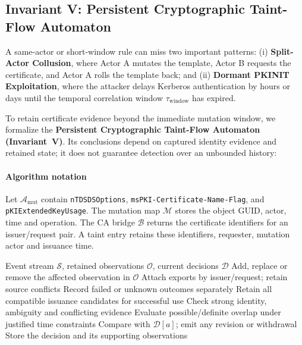 \subsection{Invariant V: Persistent Cryptographic Taint-Flow Automaton}
A same-actor or short-window rule can miss two important patterns: (i) \textbf{Split-Actor Collusion}, where Actor A mutates the template, Actor B requests the certificate, and Actor A rolls the template back; and (ii) \textbf{Dormant PKINIT Exploitation}, where the attacker delays Kerberos authentication by hours or days until the temporal correlation window $\tau_{\text{window}}$ has expired.

To retain certificate evidence beyond the immediate mutation window, we formalize the \textbf{Persistent Cryptographic Taint-Flow Automaton (Invariant~V)}. Its conclusions depend on captured identity evidence and retained state; it does not guarantee detection over an unbounded history:

\paragraph{Algorithm notation}
Let $\mathcal A_{\mathrm{mut}}$ contain \texttt{nTDSDSOptions}, \texttt{msPKI-Certificate-Name-Flag}, and \texttt{pKIExtendedKeyUsage}. The mutation map $\mathcal M$ stores the object GUID, actor, time and operation. The CA bridge $\mathcal B$ returns the certificate identifiers for an issuer/request pair. A taint entry retains these identifiers, requester, mutation actor and issuance time.

\begin{algorithm}[tbp]
\caption{CIPG certificate-lineage update}
\label{alg:invariant5}
\footnotesize
\begin{algorithmic}[1]
\Require Event stream $\mathcal S$, retained observations $\mathcal O$, current decisions $\mathcal D$
 \State Add, replace or remove the affected observation in $\mathcal O$
 \State Attach exports by issuer/request; retain source conflicts
  \State Record failed or unknown outcomes separately
  \State Retain all compatible issuance candidates for successful use
  \State Check strong identity, ambiguity and conflicting evidence
  \State Evaluate possible/definite overlap under justified time constraints
  \State Compare with $\mathcal D[a]$; emit any revision or withdrawal
  \State Store the decision and its supporting observations
 \EndFor
\EndFor
\end{algorithmic}
\end{algorithm}


